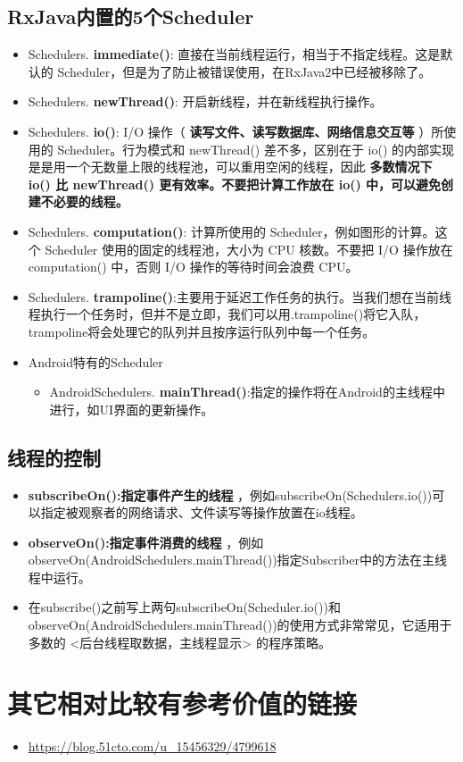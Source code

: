 \documentclass[9pt, b5paper]{article}
\begin{document}
\subsection{RxJava内置的5个Scheduler}
\label{sec-16-1}
\begin{itemize}
\item Schedulers. \textbf{immediate()}: 直接在当前线程运行，相当于不指定线程。这是默认的 Scheduler，但是为了防止被错误使用，在RxJava2中已经被移除了。
\item Schedulers. \textbf{newThread()}: 开启新线程，并在新线程执行操作。
\item Schedulers. \textbf{io()}: I/O 操作（ \textbf{读写文件、读写数据库、网络信息交互等} ）所使用的 Scheduler。行为模式和 newThread() 差不多，区别在于 io() 的内部实现是是用一个无数量上限的线程池，可以重用空闲的线程，因此 \textbf{多数情况下 io() 比 newThread() 更有效率。不要把计算工作放在 io() 中，可以避免创建不必要的线程。}
\item Schedulers. \textbf{computation()}: 计算所使用的 Scheduler，例如图形的计算。这个 Scheduler 使用的固定的线程池，大小为 CPU 核数。不要把 I/O 操作放在 computation() 中，否则 I/O 操作的等待时间会浪费 CPU。
\item Schedulers. \textbf{trampoline()}:主要用于延迟工作任务的执行。当我们想在当前线程执行一个任务时，但并不是立即，我们可以用.trampoline()将它入队，trampoline将会处理它的队列并且按序运行队列中每一个任务。
\item Android特有的Scheduler
\begin{itemize}
\item AndroidSchedulers. \textbf{mainThread()}:指定的操作将在Android的主线程中进行，如UI界面的更新操作。
\end{itemize}
\end{itemize}
\subsection{线程的控制}
\label{sec-16-2}
\begin{itemize}
\item \textbf{subscribeOn():指定事件产生的线程} ，例如subscribeOn(Schedulers.io())可以指定被观察者的网络请求、文件读写等操作放置在io线程。
\item \textbf{observeOn():指定事件消费的线程} ，例如observeOn(AndroidSchedulers.mainThread())指定Subscriber中的方法在主线程中运行。
\item 在subscribe()之前写上两句subscribeOn(Scheduler.io())和observeOn(AndroidSchedulers.mainThread())的使用方式非常常见，它适用于多数的 <后台线程取数据，主线程显示> 的程序策略。
\end{itemize}

\section{其它相对比较有参考价值的链接}
\label{sec-17}
\begin{itemize}
\item \url{https://blog.51cto.com/u_15456329/4799618}
\end{itemize}
\end{document}
